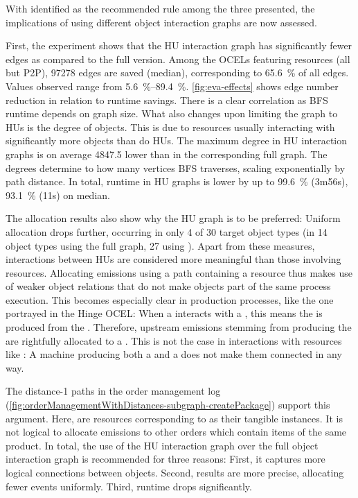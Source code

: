 With  identified as the recommended rule among the three presented, the implications of using different object interaction graphs are now assessed.

First, the experiment shows that the HU interaction graph has significantly fewer edges as compared to the full version. Among the OCELs featuring resources (all but P2P), \num{97278} edges are saved (median), corresponding to \qty{65.6}{\percent} of all edges. Values observed range from \qtyrange{5.6}{89.4}{\percent}.
\autoref{fig:eva-effects} shows edge number reduction in relation to runtime savings. There is a clear correlation as BFS runtime depends on graph size.
What also changes upon limiting the graph to HUs is the degree of objects. This is due to resources usually interacting with significantly more objects than do HUs.
The maximum degree in HU interaction graphs is on average 4847.5 lower than in the corresponding full graph.
The degrees determine to how many vertices BFS traverses, scaling exponentially by path distance.
In total, runtime in HU graphs is lower by up to \qty{99.6}{\percent} (3m56s), \qty{93.1}{\percent} (11s) on median.

The allocation results also show why the HU graph is to be preferred:
Uniform allocation drops further, occurring in only 4 of 30 target object types (in 14 object types using the full graph, 27 using ).
Apart from these measures, interactions between HUs are considered more meaningful than those involving resources.
Allocating emissions using a path containing a resource thus makes use of weaker object relations that do not make objects part of the same process execution.
This becomes especially clear in production processes, like the one portrayed in the Hinge OCEL: When a  interacts with a , this means the  is produced from the .
Therefore, upstream emissions stemming from producing the  are rightfully allocated to a .
This is not the case in interactions with resources like :
A machine producing both a  and a  does not make them connected in any way.

The distance-1 paths in the order management log (\autoref{fig:orderManagementWithDistances-subgraph-createPackage})
support this argument. Here,  are resources corresponding to  as their tangible instances. It is not logical to allocate emissions to other orders which contain items of the same product.
In total, the use of the HU interaction graph over the full object interaction graph is recommended for three reasons:
First, it captures more logical connections between objects.
Second, results are more precise, allocating fewer events uniformly.
Third, runtime drops significantly.

